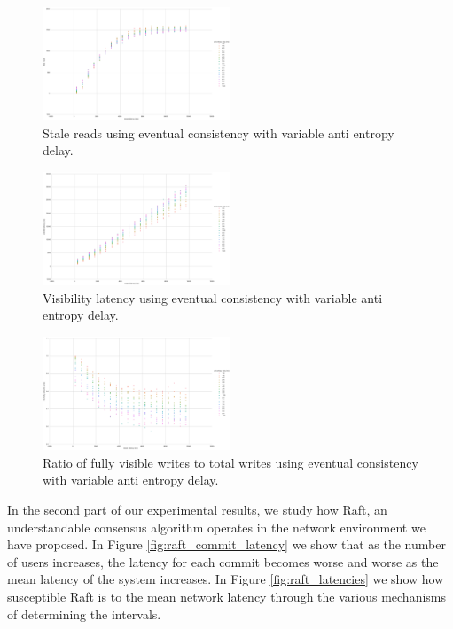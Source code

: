 \documentclass[letterpaper,twocolumn,10pt]{article}
\begin{document}
\begin{figure}[h]
    \centering
    \includegraphics[width=0.5\textwidth]{figures/ae_stale_reads}
    \caption{Stale reads using eventual consistency with variable anti entropy delay.}
    \label{fig:ae_stale_reads}
\end{figure}

\begin{figure}[h]
    \centering
    \includegraphics[width=0.5\textwidth]{figures/ae_viz_latency}
    \caption{Visibility latency using eventual consistency with variable anti entropy delay.}
    \label{fig:ae_viz_latency}
\end{figure}

\begin{figure}[h]
    \centering
    \includegraphics[width=0.5\textwidth]{figures/ae_viz_ratio}
    \caption{Ratio of fully visible writes to total writes using eventual consistency with variable anti entropy delay.}
    \label{fig:ae_viz_ratio}
\end{figure}

In the second part of our experimental results, we study how Raft, an understandable consensus algorithm operates in the network environment we have proposed. In Figure \ref{fig:raft_commit_latency} we show that as the number of users increases, the latency for each commit becomes worse and worse as the mean latency of the system increases. In Figure \ref{fig:raft_latencies} we show how susceptible Raft is to the mean network latency through the various mechanisms of determining the intervals.
\end{document}
